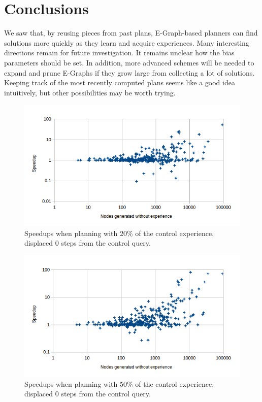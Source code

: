 \documentclass[letterpaper]{article}
\begin{document}
\section{Conclusions}

We saw that, by reusing pieces from past plans, E-Graph-based planners can find solutions more quickly as they learn and acquire experiences. Many interesting directions remain for future investigation. It remains unclear how the bias parameters should be set. In addition, more advanced schemes will be needed to expand and prune E-Graphs if they grow large from collecting a lot of solutions. Keeping track of the most recently computed plans seems like a good idea intuitively, but other possibilities may be worth trying.
\begin{figure}
	\centering
	\includegraphics[scale=0.5]{Speedup_20_0.png}
	\caption{Speedups when planning with 20\% of the control experience, displaced 0 steps from the control query.}
	 \label{fig:s_20_0}
\end{figure}

\begin{figure}
	\centering
	\includegraphics[scale=0.5]{Speedup_50_0.png}
	\caption{Speedups when planning with 50\% of the control experience, displaced 0 steps from the control query.}
	 \label{fig:s_50_0}
\end{figure}
\end{document}
